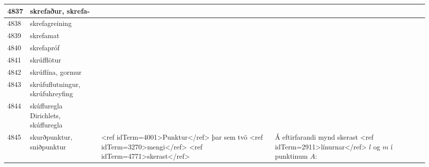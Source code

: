 \begin{longtable}{p{}|p{}|p{}|p{}|p{}}
\hline
4837 & skrefaður, skrefa- &  &  &  \\
\hline
4838 & skrefagreining &  &  &  \\
\hline
4839 & skrefamat &  &  &  \\
\hline
4840 & skrefapróf &  &  &  \\
\hline
4841 & skrúfflötur &  &  &  \\
\hline
4842 & skrúflína, gormur &  &  &  \\
\hline
4843 & skrúfuflutningur, skrúfuhreyfing &  &  &  \\
\hline
4844 & skúffuregla Dirichlets, skúffuregla &  &  &  \\
\hline
4845 & skurðpunktur, sniðpunktur & <ref idTerm=4001>Punktur</ref> þar sem tvö <ref idTerm=3270>mengi</ref> <ref idTerm=4771>skerast</ref> & Á eftirfarandi mynd skerast <ref idTerm=2911>línurnar</ref> $l$ og $m$ í punktinum $A$: 


\end{longtable}
